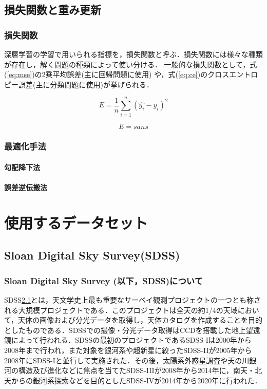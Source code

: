\documentclass[a4j, 11pt]{jreport}
\begin{document}
\section{損失関数と重み更新}
\subsection{損失関数}
深層学習の学習で用いられる指標を，損失関数と呼ぶ．損失関数には様々な種類が存在し，解く問題の種類によって使い分ける．
一般的な損失関数として，式(\ref{eq:mse})の2乗平均誤差(主に回帰問題に使用) や，式(\ref{eq:ce})のクロスエントロピー誤差(主に分類問題に使用)が挙げられる．

\begin{equation}
	E = \frac{1}{n} \sum_{i=1}^{n} (\hat{y_i} - y_i)^2
	\label{eq:mse}
\end{equation}

\begin{equation}
	E = sans
	\label{eq:ce}
\end{equation}

\subsection{最適化手法}
\subsubsection{勾配降下法}
\subsubsection{誤差逆伝搬法}


\newpage
\chapter{使用するデータセット}
\section{Sloan Digital Sky Survey(SDSS)}
\subsection*{Sloan Digital Sky Survey (以下，SDSS)について}
SDSS\ref{}とは，天文学史上最も重要なサーベイ観測プロジェクトの一つとも称される大規模プロジェクトである．このプロジェクトは全天の約1/4の天域において，天体の画像および分光データを取得し，天体カタログを作成することを目的としたものである．SDSSでの撮像・分光データ取得はCCDを搭載した地上望遠鏡によって行われる．SDSSの最初のプロジェクトであるSDSS-Iは2000年から2008年まで行われ，また対象を銀河系や超新星に絞ったSDSS-IIが2005年から2008年にSDSS-Iと並行して実施された．その後，太陽系外惑星調査や天の川銀河の構造及び進化などに焦点を当てたSDSS-IIIが2008年から2014年に，南天・北天からの銀河系探索などを目的としたSDSS-IVが2014年から2020年に行われた．
\end{document}
